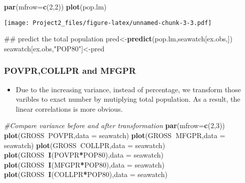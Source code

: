 \documentclass[]{article}
\newenvironment{Shaded}{\begin{snugshade}}{\end{snugshade}}
\newcommand{\KeywordTok}[1]{\textcolor[rgb]{0.13,0.29,0.53}{\textbf{#1}}}
\newcommand{\DataTypeTok}[1]{\textcolor[rgb]{0.13,0.29,0.53}{#1}}
\newcommand{\DecValTok}[1]{\textcolor[rgb]{0.00,0.00,0.81}{#1}}
\newcommand{\StringTok}[1]{\textcolor[rgb]{0.31,0.60,0.02}{#1}}
\newcommand{\CommentTok}[1]{\textcolor[rgb]{0.56,0.35,0.01}{\textit{#1}}}
\newcommand{\OperatorTok}[1]{\textcolor[rgb]{0.81,0.36,0.00}{\textbf{#1}}}
\newcommand{\NormalTok}[1]{#1}
\providecommand{\tightlist}{%
  \setlength{\itemsep}{0pt}\setlength{\parskip}{0pt}}
\begin{document}
\begin{Shaded}
\begin{Highlighting}[]
\KeywordTok{par}\NormalTok{(}\DataTypeTok{mfrow=}\KeywordTok{c}\NormalTok{(}\DecValTok{2}\NormalTok{,}\DecValTok{2}\NormalTok{))}
\KeywordTok{plot}\NormalTok{(pop.lm)}
\end{Highlighting}
\end{Shaded}

\texttt{[image: Project2\_files/figure-latex/unnamed-chunk-3-3.pdf]}

\begin{Shaded}
\begin{Highlighting}[]
\NormalTok{## predict the total population}
\NormalTok{pred<-}\KeywordTok{predict}\NormalTok{(pop.lm,seawatch[ex.obs,])}
\NormalTok{seawatch[ex.obs,}\StringTok{"POP80"}\NormalTok{]<-pred}
\end{Highlighting}
\end{Shaded}

\subsubsection{POVPR,COLLPR and MFGPR}\label{povprcollpr-and-mfgpr}

\begin{itemize}
\tightlist
\item
  Due to the increasing variance, instead of percentage, we transform
  those varibles to exact number by mutiplying total population. As a
  result, the linear correlations is more obvious.
\end{itemize}

\begin{Shaded}
\begin{Highlighting}[]
\CommentTok{#Compare variance before and after transformation}
\KeywordTok{par}\NormalTok{(}\DataTypeTok{mfrow=}\KeywordTok{c}\NormalTok{(}\DecValTok{2}\NormalTok{,}\DecValTok{3}\NormalTok{))}
\KeywordTok{plot}\NormalTok{(GROSS}\OperatorTok{~}\NormalTok{POVPR,}\DataTypeTok{data =}\NormalTok{ seawatch)}
\KeywordTok{plot}\NormalTok{(GROSS}\OperatorTok{~}\NormalTok{MFGPR,}\DataTypeTok{data =}\NormalTok{ seawatch)}
\KeywordTok{plot}\NormalTok{(GROSS}\OperatorTok{~}\NormalTok{COLLPR,}\DataTypeTok{data =}\NormalTok{ seawatch)}
\KeywordTok{plot}\NormalTok{(GROSS}\OperatorTok{~}\KeywordTok{I}\NormalTok{(POVPR}\OperatorTok{*}\NormalTok{POP80),}\DataTypeTok{data =}\NormalTok{ seawatch)}
\KeywordTok{plot}\NormalTok{(GROSS}\OperatorTok{~}\KeywordTok{I}\NormalTok{(MFGPR}\OperatorTok{*}\NormalTok{POP80),}\DataTypeTok{data =}\NormalTok{ seawatch)}
\KeywordTok{plot}\NormalTok{(GROSS}\OperatorTok{~}\KeywordTok{I}\NormalTok{(COLLPR}\OperatorTok{*}\NormalTok{POP80),}\DataTypeTok{data =}\NormalTok{ seawatch)}
\end{Highlighting}
\end{Shaded}
\end{document}
